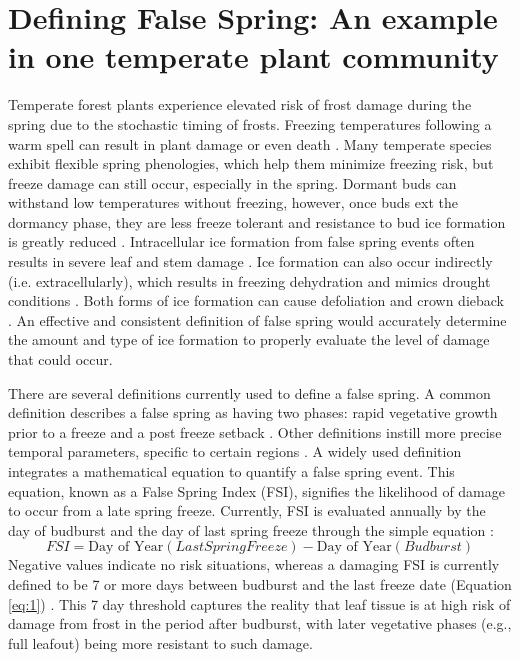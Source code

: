 \documentclass{article}\usepackage[]{graphicx}\usepackage[]{color}
\begin{document}
\section{Defining False Spring: An example in one temperate plant community}
Temperate forest plants experience elevated risk of frost damage during the spring due to the stochastic timing of frosts. Freezing temperatures following a warm spell can result in plant damage or even death \citep{Ludlum1968, Mock2007}. Many temperate species exhibit flexible spring phenologies, which help them minimize freezing risk, but freeze damage can still occur, especially in the spring. Dormant buds can withstand low temperatures without freezing, however, once buds ext the dormancy phase, they are less freeze tolerant and resistance to bud ice formation is greatly reduced \citep{Taschler2004, Lenz2013, Vitasse2014a}. Intracellular ice formation from false spring events often results in severe leaf and stem damage \citep{Burke1976, Sakai1987}. Ice formation can also occur indirectly (i.e. extracellularly), which results in freezing dehydration and mimics drought conditions \citep{Pearce2001, Beck2004, Hofmann2015}. Both forms of ice formation can cause defoliation and crown dieback \citep{Gu2008}. An effective and consistent definition of false spring would accurately determine the amount and type of ice formation to properly evaluate the level of damage that could occur.

There are several definitions currently used to define a false spring. A common definition describes a false spring as having two phases: rapid vegetative growth prior to a freeze and a post freeze setback \citep{Gu2008}. Other definitions instill more precise temporal parameters, specific to certain regions \citep[e.g., in][false spring for the Midwestern United States is defined as a warmer than average March, a freezing April, and enough growing degree days between budburst and the last freeze date]{Augspurger2013}. A widely used definition integrates a mathematical equation to quantify a false spring event. This equation, known as a False Spring Index (FSI), signifies the likelihood of damage to occur from a late spring freeze. Currently, FSI is evaluated annually by the day of budburst and the day of last spring freeze \citep[often calculated at -2.2$^{\circ}$C][]{Schwartz1993} through the simple equation \citep{Marino2011}:
\begin{equation} \label{eq:1}
FSI = \text{Day of Year} (Last Spring Freeze) - \text{Day of Year} (Budburst)
\end{equation}
Negative values indicate no risk situations, whereas a damaging FSI is currently defined to be 7 or more days between budburst and the last freeze date (Equation \ref{eq:1}) \citep{Peterson2014}. This 7 day threshold captures the reality that leaf tissue is at high risk of damage from frost in the period after budburst, with later vegetative phases (e.g., full leafout) being more resistant to such damage.%
\end{document}

